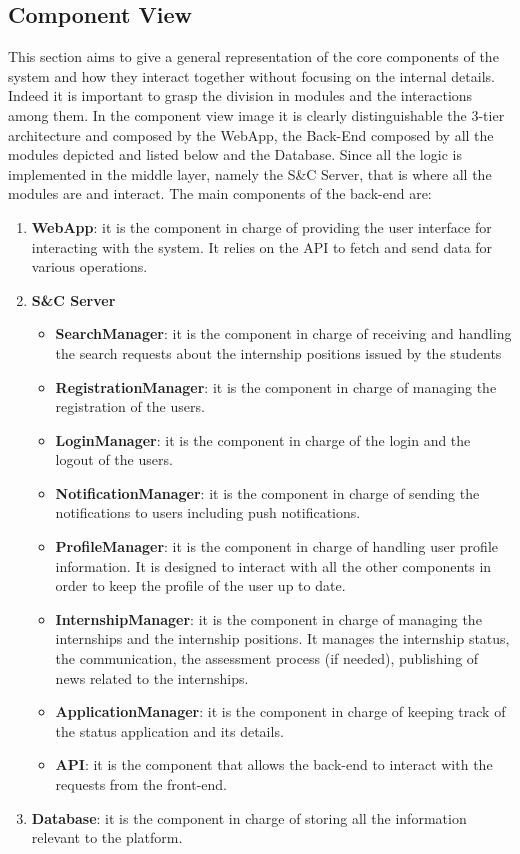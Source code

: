 \subsection{Component View}
This section aims to give a general representation of the core components of the system and how they interact together without focusing on the internal details.
Indeed it is important to grasp the division in modules and the interactions among them. In the component view image it is clearly distinguishable the 3-tier architecture and composed by the WebApp, the Back-End composed by all the modules depicted and listed below and the Database. Since all the logic is implemented in the middle layer, namely the S\&C Server, that is where all the modules are and interact.
The main components of the back-end are:
\begin{enumerate}
    \item \textbf{WebApp}: it is the component in charge of providing the user interface for interacting with the system. It relies on the API to fetch and send data for various operations.
    \item \textbf{S\&C Server}
    \begin{itemize}
        \item \textbf{SearchManager}: it is the component in charge of receiving and handling the search requests about the internship positions issued by the students 
        \item \textbf{RegistrationManager}: it is the component in charge of managing the registration of the users.
        \item \textbf{LoginManager}: it is the component in charge of the login and the logout of the users.
        \item \textbf{NotificationManager}: it is the component in charge of sending the notifications to users including push notifications.
        \item \textbf{ProfileManager}: it is the component in charge of handling user profile information. It is designed to interact with all the other components in order to keep the profile of the user up to date.
        \item \textbf{InternshipManager}: it is the component in charge of managing the internships and the internship positions. It manages the internship status, the communication, the assessment process (if needed), publishing of news related to the internships.
        \item \textbf{ApplicationManager}: it is the component in charge of keeping track of the status application and its details.
        \item \textbf{API}: it is the component that allows the back-end to interact with the requests from the front-end.
    \end{itemize}
    \item \textbf{Database}: it is the component in charge of storing all the information relevant to the platform.


\end{enumerate}
